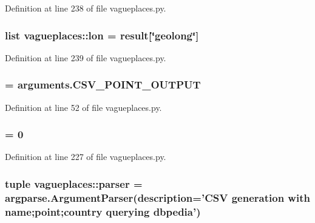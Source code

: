 \-Definition at line 238 of file vagueplaces.\-py.

\hypertarget{namespacevagueplaces_a95b2086442c1258ddf336e75265f6885}{
\subsubsection[{lon}]{\setlength{\rightskip}{0pt plus 5cm}list {\bf vagueplaces\-::lon} = result\mbox{[}\char`\"{}geolong\char`\"{}\mbox{]}}}\label{namespacevagueplaces_a95b2086442c1258ddf336e75265f6885}


\-Definition at line 239 of file vagueplaces.\-py.

\hypertarget{namespacevagueplaces_a206384d666558c145679f9ecdb3dd7c5}{
\subsubsection[{\-O\-F}]{ = arguments.\-C\-S\-V\-\_\-\-P\-O\-I\-N\-T\-\_\-\-O\-U\-T\-P\-U\-T}}\label{namespacevagueplaces_a206384d666558c145679f9ecdb3dd7c5}


\-Definition at line 52 of file vagueplaces.\-py.

\hypertarget{namespacevagueplaces_aedee1b25605e448202ade844e392b896}{
\subsubsection[{offset}]{ = 0}}\label{namespacevagueplaces_aedee1b25605e448202ade844e392b896}


\-Definition at line 227 of file vagueplaces.\-py.

\hypertarget{namespacevagueplaces_a12260e069d767b0750c1e8f31af9cefb}{
\subsubsection[{parser}]{\setlength{\rightskip}{0pt plus 5cm}tuple {\bf vagueplaces\-::parser} = argparse.\-Argument\-Parser(description='\-C\-S\-V generation with name;point;{\bf country} querying dbpedia')}}\label{namespacevagueplaces_a12260e069d767b0750c1e8f31af9cefb}


